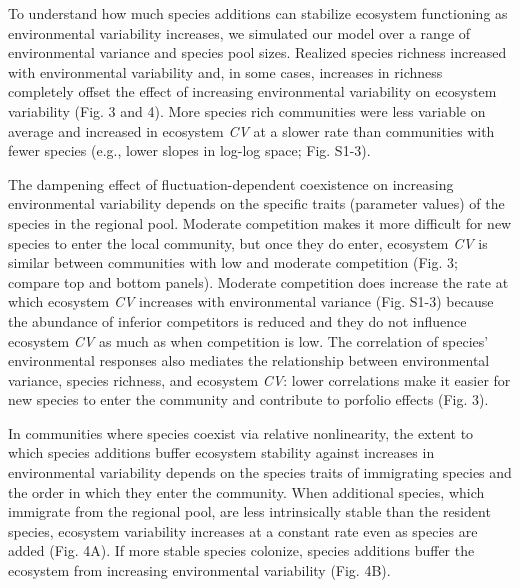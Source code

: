 \documentclass[12pt,]{article}
\begin{document}
To understand how much species additions can stabilize ecosystem
functioning as environmental variability increases, we simulated our
model over a range of environmental variance and species pool sizes.
Realized species richness increased with environmental variability and,
in some cases, increases in richness completely offset the effect of
increasing environmental variability on ecosystem variability (Fig. 3
and 4). More species rich communities were less variable on average and
increased in ecosystem \emph{CV} at a slower rate than communities with
fewer species (e.g., lower slopes in log-log space; Fig. S1-3).

The dampening effect of fluctuation-dependent coexistence on increasing
environmental variability depends on the specific traits (parameter
values) of the species in the regional pool. Moderate competition makes
it more difficult for new species to enter the local community, but once
they do enter, ecosystem \emph{CV} is similar between communities with
low and moderate competition (Fig. 3; compare top and bottom panels).
Moderate competition does increase the rate at which ecosystem \emph{CV}
increases with environmental variance (Fig. S1-3) because the abundance
of inferior competitors is reduced and they do not influence ecosystem
\emph{CV} as much as when competition is low. The correlation of
species' environmental responses also mediates the relationship between
environmental variance, species richness, and ecosystem \emph{CV}: lower
correlations make it easier for new species to enter the community and
contribute to porfolio effects (Fig. 3).

In communities where species coexist via relative nonlinearity, the
extent to which species additions buffer ecosystem stability against
increases in environmental variability depends on the species traits of
immigrating species and the order in which they enter the community.
When additional species, which immigrate from the regional pool, are
less intrinsically stable than the resident species, ecosystem
variability increases at a constant rate even as species are added (Fig.
4A). If more stable species colonize, species additions buffer the
ecosystem from increasing environmental variability (Fig. 4B).
\end{document}
